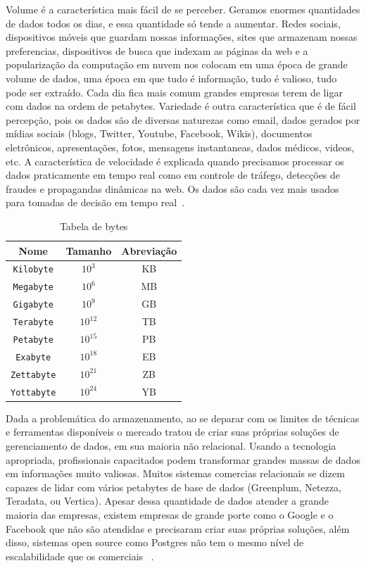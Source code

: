 Volume é a característica mais fácil de se perceber. Geramos enormes quantidades de dados todos os dias, e essa quantidade só tende a aumentar. Redes sociais, dispositivos móveis que guardam nossas informações, sites que armazenam nossas preferencias, dispositivos de busca que indexam as páginas da web e a popularização da computação em nuvem nos colocam em uma época de grande volume de dados, uma época em que tudo é informação, tudo é valioso, tudo pode ser extraído. Cada dia fica mais comum grandes empresas terem de ligar com dados na ordem de petabytes. Variedade é outra característica que é de fácil percepção, pois os dados são de diversas naturezas como email, dados gerados por mídias sociais (blogs, Twitter, Youtube, Facebook, Wikis), documentos eletrônicos, apresentações, fotos, mensagens instantaneas, dados médicos, videos, etc. A característica de velocidade é explicada quando precisamos processar os dados praticamente em tempo real como em controle de tráfego, detecções de fraudes e propagandas dinâmicas na web. Os dados são cada vez mais usados para tomadas de decisão em tempo real~\cite{promiseperil}.

\begin{table}
	\caption{Tabela de bytes}
	\begin{center}
	\begin{tabular}{ccc}
		\hline
			\textbf{Nome} & \textbf{Tamanho} & \textbf{Abreviação} \\
		\hline
			\texttt{Kilobyte}	& $10^3$ & KB \\
			\texttt{Megabyte}	& $10^6$ & MB \\
			\texttt{Gigabyte}	& $10^9$ & GB \\
			\texttt{Terabyte}	& $10^{12}$ & TB \\
			\texttt{Petabyte}	& $10^{15}$ & PB \\
			\texttt{Exabyte}	& $10^{18}$ & EB \\
			\texttt{Zettabyte}	& $10^{21}$ & ZB \\
			\texttt{Yottabyte}	& $10^{24}$ & YB \\
		\hline
	\end {tabular}
	\end{center}
	\label{tab:bytes}
\end{table}

Dada a problemática do armazenamento, ao se deparar com os limites de técnicas e ferramentas disponíveis o mercado tratou de criar suas próprias soluções de gerenciamento de dados, em sua maioria não relacional. Usando a tecnologia apropriada, profissionais capacitados podem transformar grandes massas de dados em informações muito valiosas. Muitos sistemas comercias relacionais se dizem capazes de lidar com vários petabytes de base de dados (Greenplum, Netezza, Teradata, ou Vertica). Apesar dessa quantidade de dados atender a grande maioria das empresas, existem empresas de grande porte como o Google e o Facebook que não são atendidas e precisaram criar suas próprias soluções, além disso, sistemas open source como Postgres  não tem o mesmo nível de escalabilidade que os comerciais ~\cite{fromdbtobigdata}.

